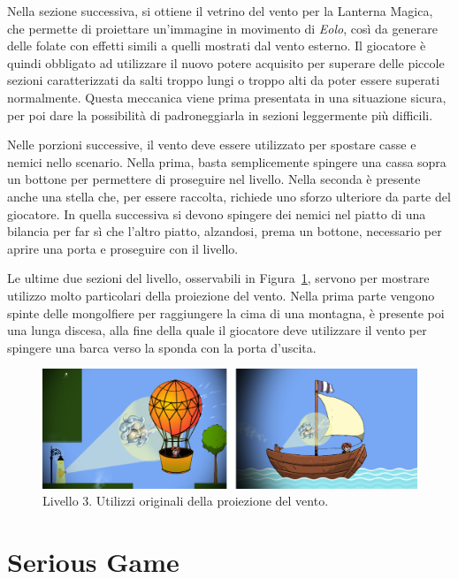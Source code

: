 Nella sezione successiva, si ottiene il vetrino del vento per la Lanterna Magica, che permette di proiettare un’immagine in movimento di \textit{Eolo}, così da generare delle folate con effetti simili a quelli mostrati dal vento esterno.
Il giocatore è quindi obbligato ad utilizzare il nuovo potere acquisito per superare delle piccole sezioni caratterizzati da salti troppo lungi o troppo alti da poter essere superati normalmente. Questa meccanica viene prima presentata in una situazione sicura, per poi dare la possibilità di padroneggiarla in sezioni leggermente più difficili.

Nelle porzioni successive, il vento deve essere utilizzato per spostare casse e nemici nello scenario. Nella prima, basta semplicemente spingere una cassa sopra un bottone per permettere di proseguire nel livello. Nella seconda è presente anche una stella che, per essere raccolta, richiede uno sforzo ulteriore da parte del giocatore. In quella successiva si devono spingere dei nemici nel piatto di una bilancia per far sì che l’altro piatto, alzandosi, prema un bottone, necessario per aprire una porta e proseguire con il livello.

Le ultime due sezioni del livello, osservabili in Figura~\ref{fig:livello3_vento_proiezione}, servono per mostrare utilizzo molto particolari della proiezione del vento. Nella prima parte vengono spinte delle mongolfiere per raggiungere la cima di una montagna, è presente poi una lunga discesa, alla fine della quale il giocatore deve utilizzare il vento per spingere una barca verso la sponda con la porta d’uscita.

\begin{figure}%
	\centering
	\includegraphics[width= 0.95\columnwidth]{images/gameDesign/51_vento.jpg}
	\caption{Livello 3. Utilizzi originali della proiezione del vento.}
	\label{fig:livello3_vento_proiezione}
\end{figure}

\section{Serious Game}
\label{sec:design_serious}

